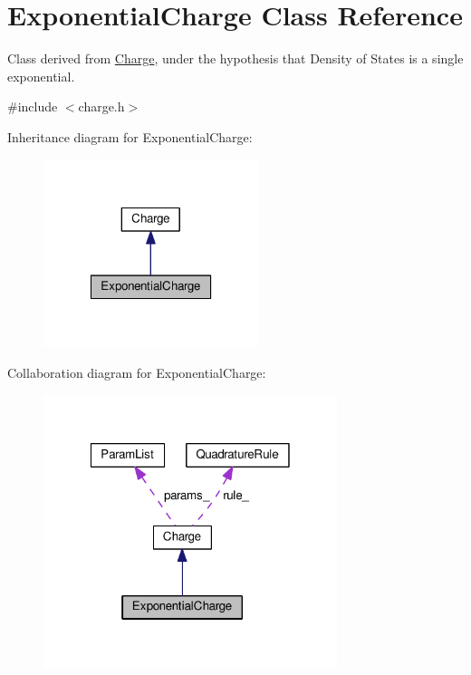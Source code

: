 \hypertarget{classExponentialCharge}{\section{Exponential\-Charge Class Reference}
\label{classExponentialCharge}
}


Class derived from \hyperlink{classCharge}{Charge}, under the hypothesis that Density of States is a single exponential.  




{\ttfamily \#include $<$charge.\-h$>$}



Inheritance diagram for Exponential\-Charge\-:\nopagebreak
\begin{figure}[H]
\begin{center}
\leavevmode
\includegraphics[width=178pt]{classExponentialCharge__inherit__graph}
\end{center}
\end{figure}


Collaboration diagram for Exponential\-Charge\-:\nopagebreak
\begin{figure}[H]
\begin{center}
\leavevmode
\includegraphics[width=243pt]{classExponentialCharge__coll__graph}
\end{center}
\end{figure}
